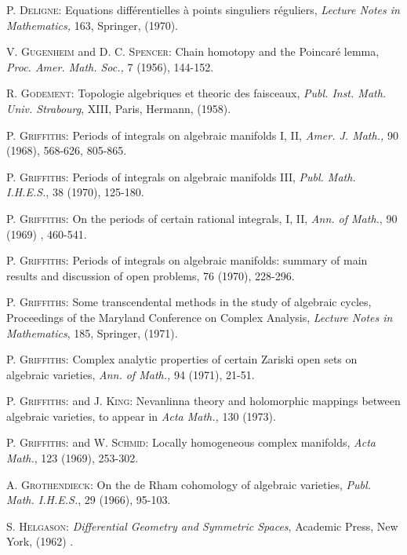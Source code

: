 \begin{thebibliography}{99}
 \textsc{P. Deligne}: Equations diff\'erentielles \`a points singuliers r\'eguliers, \textit{Lecture Notes in Mathematics,} 163, Springer, (1970).

 \textsc{V. Gugenheim} and \textsc{D. C. Spencer}: Chain homotopy and the Poincar\'e lemma, \textit{Proc. Amer. Math. Soc.,} 7 (1956), 144-152.

 \textsc{R. Godement}: Topologie algebriques et theoric des faisceaux, \textit{Publ. Inst. Math. Univ. Strabourg}, XIII, Paris, Hermann, (1958).

 \textsc{P. Griffiths}: Periods of integrals on algebraic manifolds I, II, \textit{Amer. J. Math.,} 90 (1968), 568-626, 805-865.

 \textsc{P. Griffiths}: Periods of integrals on algebraic manifolds III, \textit{Publ. Math. I.H.E.S.}, 38 (1970), 125-180.

 \textsc{P. Griffiths}: On the periods of certain rational integrals, I, II, \textit{Ann. of Math.}, 90 (1969) , 460-541.

 \textsc{P. Griffiths}: Periods of integrals on algebraic manifolds: summary of main results and discussion of open problems,  76 (1970), 228-296.

 \textsc{P. Griffiths}: Some transcendental methods in the study of algebraic cycles, Proceedings of the Maryland Conference on Complex Analysis, \textit{Lecture Notes in Mathematics}, 185, Springer, (1971).

 \textsc{P. Griffiths}: Complex analytic properties of certain Zariski open sets on algebraic varieties, \textit{Ann. of Math.,} 94 (1971), 21-51.

 \textsc{P. Griffiths}: and \textsc{J. King}: Nevanlinna theory and holomorphic mappings between algebraic varieties, to appear in \textit{Acta Math.,} 130 (1973).

 \textsc{P. Griffiths}: and \textsc{W. Schmid}: Locally homogeneous complex manifolds, \textit{Acta Math.}, 123 (1969), 253-302.

 \textsc{A. Grothendieck}: On the de Rham cohomology of algebraic varieties, \textit{Publ. Math. I.H.E.S.}, 29 (1966), 95-103. 

 \textsc{S. Helgason}: \textit{Differential Geometry and Symmetric Spaces}, Academic Press, New York, (1962) .


\end{thebibliography}
